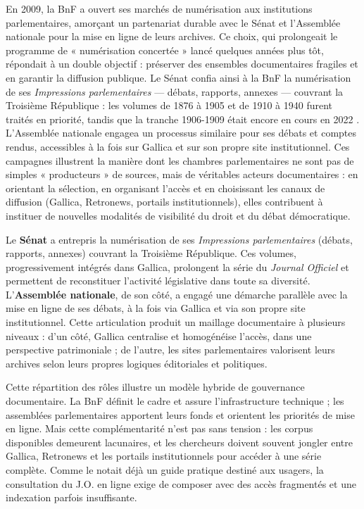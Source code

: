 En 2009, la BnF a ouvert ses marchés de numérisation aux institutions parlementaires, amorçant un partenariat durable avec le Sénat et l’Assemblée nationale pour la mise en ligne de leurs archives. Ce choix, qui prolongeait le programme de « numérisation concertée » lancé quelques années plus tôt, répondait à un double objectif : préserver des ensembles documentaires fragiles et en garantir la diffusion publique. Le Sénat confia ainsi à la BnF la numérisation de ses \emph{Impressions parlementaires} — débats, rapports, annexes — couvrant la Troisième République : les volumes de 1876 à 1905 et de 1910 à 1940 furent traités en priorité, tandis que la tranche 1906-1909 était encore en cours en 2022 . L’Assemblée nationale engagea un processus similaire pour ses débats et comptes rendus, accessibles à la fois sur Gallica et sur son propre site institutionnel. Ces campagnes illustrent la manière dont les chambres parlementaires ne sont pas de simples « producteurs » de sources, mais de véritables acteurs documentaires : en orientant la sélection, en organisant l’accès et en choisissant les canaux de diffusion (Gallica, Retronews, portails institutionnels), elles contribuent à instituer de nouvelles modalités de visibilité du droit et du débat démocratique.

Le \textbf{Sénat} a entrepris la numérisation de ses \emph{Impressions parlementaires} (débats, rapports, annexes) couvrant la Troisième République. Ces volumes, progressivement intégrés dans Gallica, prolongent la série du \emph{Journal Officiel} et permettent de reconstituer l’activité législative dans toute sa diversité. L’\textbf{Assemblée nationale}, de son côté, a engagé une démarche parallèle avec la mise en ligne de ses débats, à la fois via Gallica et via son propre site institutionnel. Cette articulation produit un maillage documentaire à plusieurs niveaux : d’un côté, Gallica centralise et homogénéise l’accès, dans une perspective patrimoniale ; de l’autre, les sites parlementaires valorisent leurs archives selon leurs propres logiques éditoriales et politiques.

Cette répartition des rôles illustre un modèle hybride de gouvernance documentaire. La BnF définit le cadre et assure l’infrastructure technique ; les assemblées parlementaires apportent leurs fonds et orientent les priorités de mise en ligne. Mais cette complémentarité n’est pas sans tension : les corpus disponibles demeurent lacunaires, et les chercheurs doivent souvent jongler entre Gallica, Retronews et les portails institutionnels pour accéder à une série complète. Comme le notait déjà un guide pratique destiné aux usagers, la consultation du J.O. en ligne exige de composer avec des accès fragmentés et une indexation parfois insuffisante.

